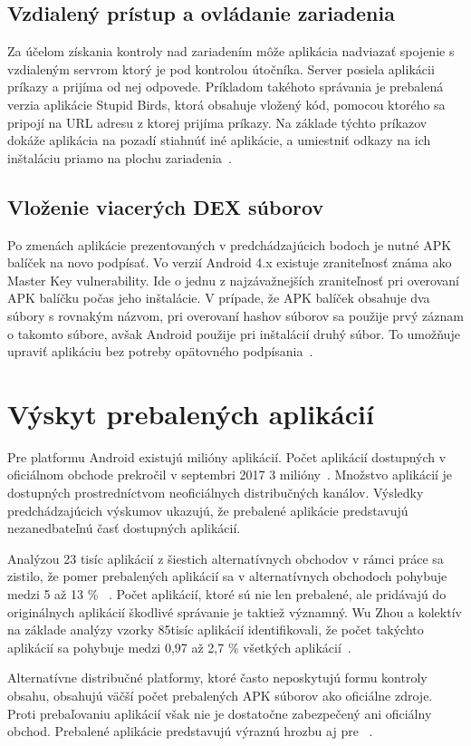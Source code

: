 \subsection*{Vzdialený prístup a ovládanie zariadenia}
Za účelom získania kontroly nad zariadením môže aplikácia nadviazať spojenie s vzdialeným servrom ktorý je pod kontrolou útočníka. Server posiela aplikácii príkazy a prijíma od nej odpovede. Príkladom takéhoto správania je prebalená verzia aplikácie Stupid Birds, ktorá obsahuje vložený kód, pomocou ktorého sa pripojí na URL adresu z ktorej prijíma príkazy. Na základe týchto príkazov dokáže aplikácia na pozadí stiahnúť iné aplikácie, a umiestniť odkazy na ich inštaláciu priamo na plochu zariadenia~\cite{fakeapps}. 

\subsection*{Vloženie viacerých DEX súborov}
Po zmenách aplikácie prezentovaných v predchádzajúcich bodoch je nutné APK balíček na novo podpísať. Vo verzií Android 4.x existuje zraniteľnosť známa ako Master Key vulnerability. Ide o jednu z najzávažnejších zraniteľnosť pri overovaní APK balíčku počas jeho inštalácie. V prípade, že APK balíček obsahuje dva súbory s rovnakým názvom, pri overovaní hashov súborov sa použije prvý záznam o takomto súbore, avšak Android použije pri inštalácií druhý súbor. To umožňuje upraviť aplikáciu bez potreby opätovného podpísania~\cite{c2gYRVCI9leJhfOJ}. 

\section{Výskyt prebalených aplikácií}
Pre platformu Android existujú milióny aplikácií. Počet aplikácií dostupných v oficiálnom obchode  prekročil v septembri 2017 3 milióny~\cite{Statista}. Množstvo aplikácií je dostupných prostredníctvom neoficiálnych distribučných kanálov.  Výsledky predchádzajúcich výskumov ukazujú, že prebalené aplikácie predstavujú nezanedbateľnú časť dostupných aplikácií.

Analýzou 23 tisíc aplikácií z šiestich alternatívnych obchodov v rámci práce  sa zistilo, že pomer prebalených aplikácií sa v alternatívnych obchodoch pohybuje medzi 5 až 13 \% ~\cite{DetectingRepackagedZhou}.
Počet aplikácií, ktoré sú nie len prebalené, ale pridávajú do originálnych aplikácií škodlivé správanie je taktiež významný. Wu Zhou a kolektív na základe analýzy vzorky 85tisíc aplikácií identifikovali, že počet takýchto aplikácií sa pohybuje medzi 0,97 až 2,7 \% všetkých aplikácií~\cite{Zhou2013}.

Alternatívne distribučné platformy, ktoré často neposkytujú formu kontroly obsahu, obsahujú väčší počet prebalených APK súborov ako oficiálne zdroje. Proti prebaľovaniu aplikácií však nie je dostatočne zabezpečený ani oficiálny obchod. Prebalené aplikácie predstavujú výraznú hrozbu aj pre ~\cite{Zhauniarovich2013}. 
